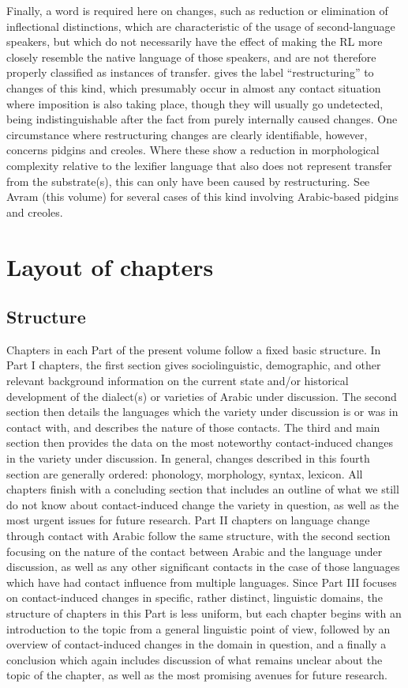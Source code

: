 \documentclass[output=paper]{langsci/langscibook}
\begin{document}
Finally, a word is required here on changes, such as reduction or elimination of inflectional distinctions, which are characteristic of the usage of second-language speakers, but which do not necessarily have the effect of making the RL more closely resemble the native language of those speakers, and are not therefore properly classified as instances of transfer. \citet{Lucas2015} gives the label ``restructuring'' to changes of this kind, which presumably occur in almost any contact situation where imposition is also taking place, though they will usually go undetected, being indistinguishable after the fact from purely internally caused changes. One circumstance where restructuring changes are clearly identifiable, however, concerns pidgins and creoles. Where these show a reduction in morphological complexity relative to the lexifier language that also does not represent transfer from the substrate(s), this can only have been caused by restructuring. See Avram (this volume) for several cases of this kind involving Arabic-based pidgins and creoles.

\section{Layout of chapters}\label{introstructure}

\subsection{Structure}
Chapters in each Part of the present volume follow a fixed basic structure. In Part I chapters, the first section gives sociolinguistic, demographic, and other relevant background information on the current state and/or historical development of the dialect(s) or varieties of Arabic under discussion. The second section then details the languages which the variety under discussion is or was in contact with, and describes the nature of those contacts. The third and main section then provides the data on the most noteworthy contact-induced changes in the variety under discussion. In general, changes described in this fourth section are generally ordered: phonology, morphology, syntax, lexicon. All chapters finish with a concluding section that includes an outline of what we still do not know about contact-induced change the variety in question, as well as the most urgent issues for future research. Part II chapters on language change through contact with Arabic follow the same structure, with the second section focusing on the nature of the contact between Arabic and the language under discussion, as well as any other significant contacts in the case of those languages which have had contact influence from multiple languages. Since Part III focuses on contact-induced changes in specific, rather distinct, linguistic domains, the structure of chapters in this Part is less uniform, but each chapter begins with an introduction to the topic from a general linguistic point of view, followed by an overview of contact-induced changes in the domain in question, and a finally a conclusion which again includes discussion of what remains unclear about the topic of the chapter, as well as the most promising avenues for future research.
\end{document}
